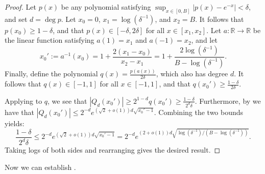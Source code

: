 \documentclass[10pt,a4paper]{article}
\newcommand{\R}{\mathbb{R}}
\theoremstyle{plain}\newtheorem{theorem}{Theorem}
\theoremstyle{definition}
\begin{document}
	\begin{proof}
	Let $p(x)$ be any polynomial satisfying $\sup_{x \in [0, B]} \big| p(x) - e^{-x} \big| < \delta$, and set $d = \deg p$. Let $x_0 = 0$, $x_1 = \log(\delta^{-1})$, and $x_2 = B$. It follows that $p(x_0) \geq 1-\delta$, and that $p(x) \in [-\delta,2\delta]$ for all $x \in [x_1,x_2]$. Let $a : \mathbb{R} \to \R$ be the linear function satisfying $a(1) = x_1$ and $a(-1) = x_2$, and let $$x_0' := a^{-1}(x_0) = 1 + \frac{2(x_1 - x_0)}{x_2 - x_1} = 1 + \frac{2\log(\delta^{-1})}{B-\log(\delta^{-1})}.$$ Finally, define the polynomial $q(x) = \frac{p(a(x))}{2\delta}$, which also has degree $d$.
    It follows that $q(x) \in [-1,1]$ for all $x \in [-1,1]$, and that $q(x_0') \geq \frac{1-\delta}{2\delta}$.
    
    Applying  to $q$, we see that $|Q_d(x_0')| \geq 2^{1-d} q(x_0') \geq \frac{1- \delta}{2^d\delta}$. Furthermore, by  we have that $|Q_d(x_0')| \leq 2^{-d}e^{(\sqrt{2} + o(1)) d \sqrt{x_0' - 1}}$. Combining the two bounds yields:
    $$\frac{1-\delta}{2^d\delta} \leq 2^{-d} e^{(\sqrt{2} + o(1)) d \sqrt{x_0' - 1}} = 2^{-d}e^{(2 + o(1)) d \sqrt{\log(\delta^{-1}) / (B-\log(\delta^{-1}))}}.$$
    Taking logs of both sides and rearranging gives the desired result.
	\end{proof}



    Now we can establish . 


	
	
\end{document}
